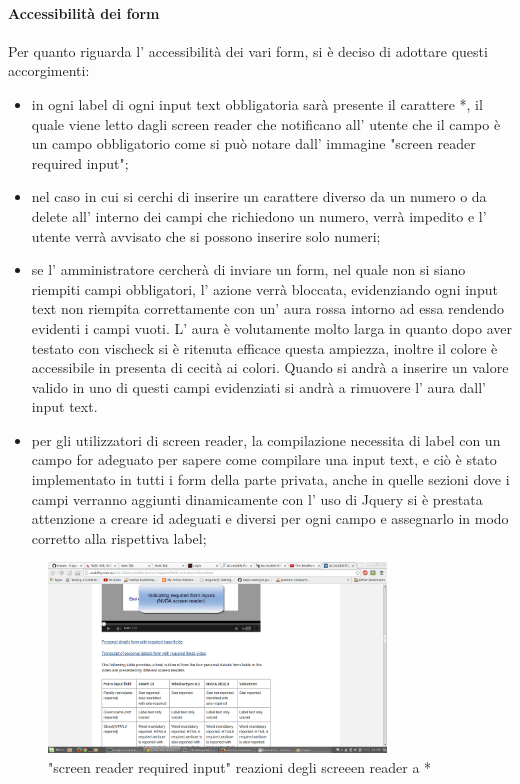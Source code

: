 \paragraph{Accessibilità dei form}
Per quanto riguarda l' accessibilità dei vari form, si è deciso di adottare questi accorgimenti:
\begin{itemize}
 \item in ogni label di ogni input text obbligatoria sarà presente il carattere *, il quale viene letto dagli screen reader che notificano all' utente che il campo è un campo obbligatorio come si può notare dall' immagine "screen reader required input";
 \item nel caso in cui si cerchi di inserire un carattere diverso da un numero o da delete all' interno dei campi che richiedono un numero, verrà impedito e l' utente verrà avvisato che si possono inserire solo numeri;
 \item se l' amministratore cercherà di inviare un form, nel quale non si siano riempiti campi obbligatori, l' azione verrà bloccata, evidenziando ogni input text non riempita correttamente con un' aura rossa intorno ad essa rendendo evidenti i campi vuoti. L' aura è volutamente molto larga in quanto dopo aver testato con vischeck si è ritenuta efficace questa ampiezza, inoltre il colore è accessibile in presenta di cecità ai colori. Quando si andrà a inserire un valore valido in uno di questi campi evidenziati si andrà a rimuovere l' aura dall' input text.
 \item per gli utilizzatori di screen reader, la compilazione necessita di label con un campo for adeguato per sapere come compilare una input text, e ciò è stato implementato in tutti i form della parte privata, anche in quelle sezioni dove i campi verranno aggiunti dinamicamente con l' uso di Jquery si è prestata attenzione a creare id adeguati e diversi per ogni campo e assegnarlo in modo corretto alla rispettiva label;
\end{itemize}
\begin{figure}[H]
		\centering \includegraphics[width=0.8\textwidth]{images/required.png}
		\caption{"screen reader required input" reazioni degli screeen reader a *}
	\end{figure}
